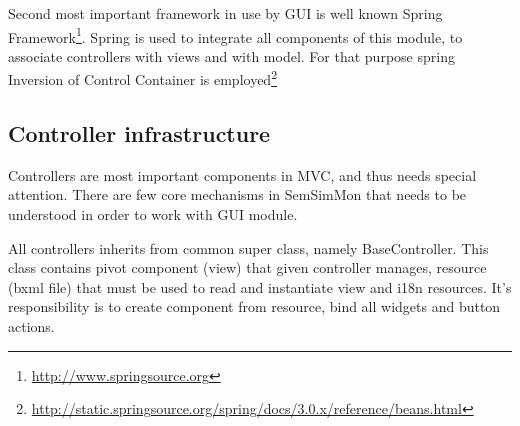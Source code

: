 Second most important framework in use by GUI is well known Spring
Framework\footnote{\url{http://www.springsource.org}}. Spring is used to integrate all components of this module,
to associate controllers with views and with model. For that purpose spring Inversion of Control Container is
employed\footnote{\url{http://static.springsource.org/spring/docs/3.0.x/reference/beans.html}}

\subsection{Controller infrastructure}

Controllers are most important components in MVC, and thus needs special attention. There are few core mechanisms in
SemSimMon that needs to be understood in order to work with GUI module. 

All controllers inherits from common super class, namely BaseController. This class contains pivot component (view)
that given controller manages, resource (bxml file) that must be used to read and instantiate view and i18n resources. 
It's responsibility is to create component from resource, bind all widgets and button actions. 

